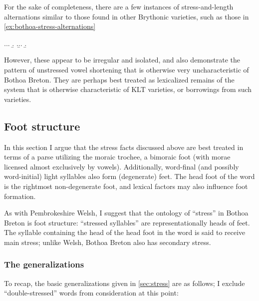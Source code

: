 For the sake of completeness, there are a few instances of stress\hyp and\hyp length alternations similar to those found in other Brythonic varieties, such as those in \cref{ex:bothoa-stress-alternations}

\ex.\label{ex:bothoa-stress-alternations}\a.\a.
\b.
\z.\b.\a.
\b.

However, these appear to be irregular and isolated, and also demonstrate the pattern of unstressed vowel shortening that is otherwise very uncharacteristic of Bothoa Breton. They are perhaps best treated as lexicalized remains of the system that is otherwise characteristic of KLT varieties, or borrowings from such varieties.

\subsection{Foot structure}
\label{sec:foot-structure}

In this section I argue that the stress facts discussed above are best treated in terms of a parse utilizing the moraic trochee, \ie a bimoraic foot (with morae licensed almost exclusively by vowels). Additionally, word-final (and possibly word-initial) light syllables also form (degenerate) feet. The head foot of the word is the rightmost non-degenerate foot, and lexical factors may also influence foot formation.

As with Pembrokeshire Welsh, I suggest that the ontology of \enquote{stress} in Bothoa Breton is foot structure: \enquote{stressed syllables} are representationally heads of feet. The syllable containing the head of the head foot in the word is said to receive main stress; unlike Welsh, Bothoa Breton also has secondary stress.

\subsubsection{The generalizations}
\label{sec:generalization}

To recap, the basic generalizations given in \cref{sec:stress} are as follows; I exclude \enquote{double-stressed} words from consideration at this point:


